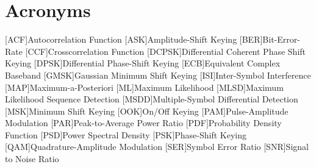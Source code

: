 \chapter{Acronyms}
\begin{acronym}[DCPSK]
    [ACF]{Autocorrelation Function}
    [ASK]{Amplitude-Shift Keying}
    [BER]{Bit-Error-Rate}
    [CCF]{Crosscorrelation Function}
    [DCPSK]{Differential Coherent Phase Shift Keying}
    [DPSK]{Differential Phase-Shift Keying}
    [ECB]{Equivalent Complex Baseband}
    [GMSK]{Gaussian Minimum Shift Keying}
    [ISI]{Inter-Symbol Interference}
    [MAP]{Maximum-a-Posteriori}
    [ML]{Maximum Likelihood}
    [MLSD]{Maximum Likelihood Sequence Detection}
    [MSDD]{Multiple-Symbol Differential Detection}
    [MSK]{Minimum Shift Keying}
    [OOK]{On/Off Keying}
    [PAM]{Pulse-Amplitude Modulation}
    [PAR]{Peak-to-Average Power Ratio}
    [PDF]{Probability Density Function}
    [PSD]{Power Spectral Density}
    [PSK]{Phase-Shift Keying}
    [QAM]{Quadrature-Amplitude Modulation}
    [SER]{Symbol Error Ratio}
    [SNR]{Signal to Noise Ratio}
\end{acronym}
